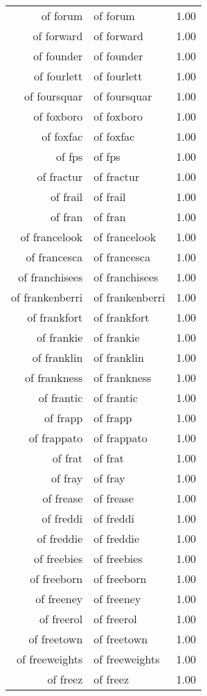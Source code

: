 \begin{table}[ht]
\begin{tabular}{rlr}
  of forum & of forum & 1.00 \\ 
  of forward & of forward & 1.00 \\ 
  of founder & of founder & 1.00 \\ 
  of fourlett & of fourlett & 1.00 \\ 
  of foursquar & of foursquar & 1.00 \\ 
  of foxboro & of foxboro & 1.00 \\ 
  of foxfac & of foxfac & 1.00 \\ 
  of fps & of fps & 1.00 \\ 
  of fractur & of fractur & 1.00 \\ 
  of frail & of frail & 1.00 \\ 
  of fran & of fran & 1.00 \\ 
  of francelook & of francelook & 1.00 \\ 
  of francesca & of francesca & 1.00 \\ 
  of franchisees & of franchisees & 1.00 \\ 
  of frankenberri & of frankenberri & 1.00 \\ 
  of frankfort & of frankfort & 1.00 \\ 
  of frankie & of frankie & 1.00 \\ 
  of franklin & of franklin & 1.00 \\ 
  of frankness & of frankness & 1.00 \\ 
  of frantic & of frantic & 1.00 \\ 
  of frapp & of frapp & 1.00 \\ 
  of frappato & of frappato & 1.00 \\ 
  of frat & of frat & 1.00 \\ 
  of fray & of fray & 1.00 \\ 
  of frease & of frease & 1.00 \\ 
  of freddi & of freddi & 1.00 \\ 
  of freddie & of freddie & 1.00 \\ 
  of freebies & of freebies & 1.00 \\ 
  of freeborn & of freeborn & 1.00 \\ 
  of freeney & of freeney & 1.00 \\ 
  of freerol & of freerol & 1.00 \\ 
  of freetown & of freetown & 1.00 \\ 
  of freeweights & of freeweights & 1.00 \\ 
  of freez & of freez & 1.00 \\ 

\end{tabular}
\end{table}
